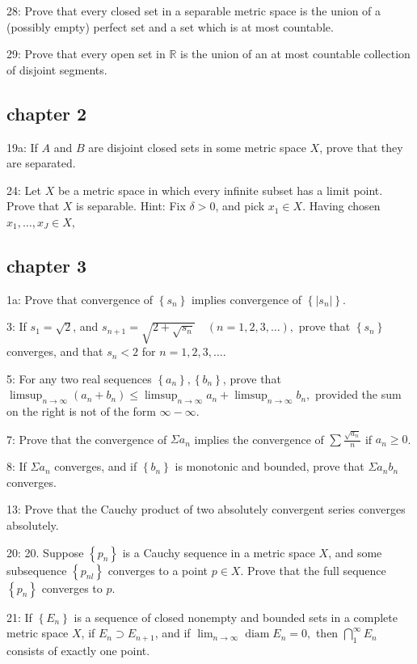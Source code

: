 \documentclass{article}
\begin{document}
28: Prove that every closed set in a separable metric space is the union of a (possibly empty) perfect set and a set which is at most countable. 

29: Prove that every open set in $\mathbb{R}$ is the union of an at most countable collection of disjoint segments. 

\subsection*{chapter 2}
19a: If $A$ and $B$ are disjoint closed sets in some metric space $X$, prove that they are separated.

24: Let $X$ be a metric space in which every infinite subset has a limit point. Prove that $X$ is separable. Hint: Fix $\delta>0$, and pick $x_{1} \in X$. Having chosen $x_{1}, \ldots, x_{J} \in X$,

\subsection*{chapter 3}
1a: Prove that convergence of $\left\{s_{n}\right\}$ implies convergence of $\left\{\left|s_{n}\right|\right\}$. 

3: If $s_{1}=\sqrt{2}$, and $s_{n+1}=\sqrt{2+\sqrt{s_{n}}} \quad(n=1,2,3, \ldots),$ prove that $\left\{s_{n}\right\}$ converges, and that $s_{n}<2$ for $n=1,2,3, \ldots$.

5: For any two real sequences $\left\{a_{n}\right\},\left\{b_{n}\right\}$, prove that $\limsup _{n \rightarrow \infty}\left(a_{n}+b_{n}\right) \leq \limsup _{n \rightarrow \infty} a_{n}+\limsup _{n \rightarrow \infty} b_{n},$ provided the sum on the right is not of the form $\infty-\infty$.

7: Prove that the convergence of $\Sigma a_{n}$ implies the convergence of $\sum \frac{\sqrt{a_{n}}}{n}$ if $a_n\geq 0$.

8: If $\Sigma a_{n}$ converges, and if $\left\{b_{n}\right\}$ is monotonic and bounded, prove that $\Sigma a_{n} b_{n}$ converges.

13: Prove that the Cauchy product of two absolutely convergent series converges absolutely.

20: 20. Suppose $\left\{p_{n}\right\}$ is a Cauchy sequence in a metric space $X$, and some subsequence $\left\{p_{n l}\right\}$ converges to a point $p \in X$. Prove that the full sequence $\left\{p_{n}\right\}$ converges to $p$.

21: If $\left\{E_{n}\right\}$ is a sequence of closed nonempty and bounded sets in a complete metric space $X$, if $E_{n} \supset E_{n+1}$, and if $\lim _{n \rightarrow \infty} \operatorname{diam} E_{n}=0,$ then $\bigcap_{1}^{\infty} E_{n}$ consists of exactly one point.
\end{document}
